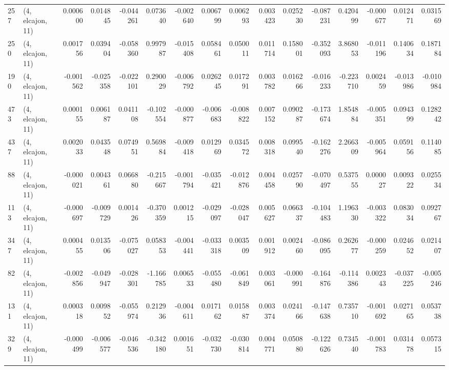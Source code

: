 \begin{tabular}{llrrrrrrrrrrrrrr}
257 &  (4, elcajon, 11) &   0.000600 &  0.014845 & -0.044261 &    0.073640 & -0.002640 &   0.006799 &  0.006293 &  0.003423 &  0.025230 & -0.087231 &    0.420499 & -0.000677 &  0.012471 &  0.031569 \\
250 &  (4, elcajon, 11) &   0.001756 &  0.039404 & -0.058360 &    0.997987 & -0.015408 &   0.058461 &  0.050011 &  0.011714 &  0.158001 & -0.352093 &    3.868053 & -0.011196 &  0.140634 &  0.187184 \\
190 &  (4, elcajon, 11) &  -0.001562 & -0.025358 & -0.022101 &    0.290029 & -0.006792 &   0.026245 &  0.017291 &  0.003782 &  0.016266 & -0.016233 &   -0.223710 &  0.002459 & -0.013986 & -0.010984 \\
473 &  (4, elcajon, 11) &   0.000155 &  0.006187 &  0.041108 &   -0.102554 & -0.000877 &  -0.006683 & -0.008822 &  0.007152 &  0.090287 & -0.173674 &    1.854884 & -0.005351 &  0.094399 &  0.128242 \\
437 &  (4, elcajon, 11) &   0.002033 &  0.043548 &  0.074951 &    0.569884 & -0.009418 &   0.012969 &  0.034572 &  0.008318 &  0.099540 & -0.162276 &    2.266309 & -0.005964 &  0.059156 &  0.114085 \\
88  &  (4, elcajon, 11) &  -0.000021 &  0.004361 &  0.066880 &   -0.215667 & -0.001794 &  -0.035421 & -0.012876 &  0.004458 &  0.025790 & -0.070497 &    0.537555 &  0.000027 &  0.009322 &  0.025534 \\
113 &  (4, elcajon, 11) &  -0.000697 & -0.009729 &  0.001426 &   -0.370359 &  0.001215 &  -0.029097 & -0.028047 &  0.005627 &  0.066337 & -0.104483 &    1.196330 & -0.003322 &  0.083034 &  0.092767 \\
347 &  (4, elcajon, 11) &   0.000455 &  0.013506 & -0.075027 &    0.058353 & -0.004441 &  -0.033318 &  0.003509 &  0.001912 &  0.002460 & -0.086095 &    0.262677 & -0.000259 &  0.024652 &  0.021407 \\
82  &  (4, elcajon, 11) &  -0.002856 & -0.049947 & -0.028301 &   -1.166785 &  0.006533 &  -0.055480 & -0.061849 &  0.003061 & -0.000991 & -0.164876 &   -0.114386 &  0.002343 & -0.037225 & -0.005246 \\
131 &  (4, elcajon, 11) &   0.000318 &  0.009852 & -0.055974 &    0.212936 & -0.004611 &   0.017162 &  0.015887 &  0.003374 &  0.024166 & -0.147638 &    0.735710 & -0.001692 &  0.027165 &  0.053738 \\
329 &  (4, elcajon, 11) &  -0.000499 & -0.006577 & -0.046536 &   -0.342180 &  0.001651 &  -0.032730 & -0.030814 &  0.004771 &  0.050880 & -0.122626 &    0.734540 & -0.001783 &  0.031478 &  0.057315 \\

\end{tabular}
